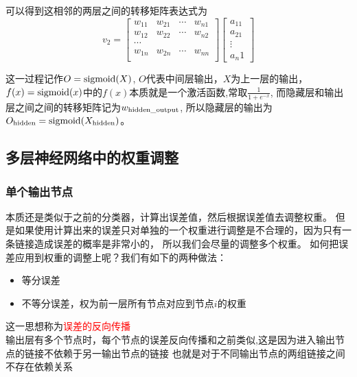 \documentclass[12pt]{article}
\begin{document}
    可以得到这相邻的两层之间的转移矩阵表达式为
    \begin{equation}
        v_2
        =
        \begin{bmatrix}
             w_{11} & w_{21} & \cdots & w_{n1}\\
             w_{12} & w_{22} & \cdots & w_{n2}\\
             \cdots\\
             w_{1n} & w_{2n} & \cdots & w_{nn}\\
        \end{bmatrix} 
        \begin{bmatrix}
            a_11\\
            a_21\\
            \vdots\\
            a_n1 
        \end{bmatrix}
    \end{equation}

    这一过程记作$O={\rm sigmoid}(X)$, $O$代表中间层输出，$X$为上一层的输出，
    $f(x)={\rm sigmoid}(x)$中的$f(x)$本质就是一个激活函数,常取$\frac{1}{1+e^{-x}}$,
    而隐藏层和输出层之间之间的转移矩阵记为$w_{\rm hidden\_output}$,
    所以隐藏层的输出为$O_{\rm hidden}={\rm sigmoid}(X_{\rm hidden})$。

    \subsection{多层神经网络中的权重调整}
    \subsubsection{单个输出节点}
    本质还是类似于之前的分类器，计算出误差值，然后根据误差值去调整权重。
    但是如果使用计算出来的误差只对单独的一个权重进行调整是不合理的，因为只有一条链接造成误差的概率是非常小的，
    所以我们会尽量的调整多个权重。
    如何把误差应用到权重的调整上呢？我们有如下的两种做法：
    \begin{itemize}
        \item 等分误差
        \item 不等分误差，权为前一层所有节点对应到节点$i$的权重
    \end{itemize}
    这一思想称为{\textcolor{red}{误差的反向传播}}\\
    输出层有多个节点时，每个节点的误差反向传播和之前类似,这是因为进入输出节点的链接不依赖于另一输出节点的链接
    也就是对于不同输出节点的两组链接之间不存在依赖关系
\end{document}
